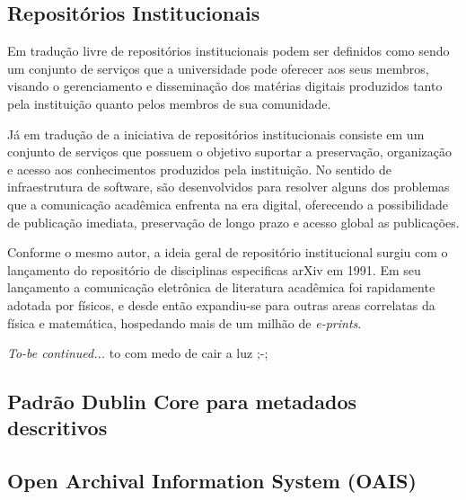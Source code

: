 \subsection{Repositórios Institucionais}

Em tradução livre de \cite{LYNCH:2003} repositórios institucionais podem
ser definidos como sendo um conjunto de serviços que a universidade pode
oferecer aos seus membros, visando o gerenciamento e disseminação dos matérias
digitais produzidos tanto pela instituição quanto pelos membros de sua comunidade.

Já em tradução de \cite{2015:Callicott} a iniciativa de repositórios institucionais
consiste em um conjunto de serviços que possuem o objetivo suportar a preservação,
organização e acesso aos conhecimentos produzidos pela instituição. No sentido de
infraestrutura de software, são desenvolvidos para resolver alguns dos problemas
que a comunicação acadêmica enfrenta na era digital, oferecendo a possibilidade
de publicação imediata, preservação de longo prazo e acesso global as publicações.

Conforme o mesmo autor, a ideia geral de repositório institucional surgiu com o
lançamento do repositório de disciplinas especificas arXiv em 1991. Em seu
lançamento a comunicação eletrônica de literatura acadêmica foi rapidamente
adotada por físicos, e desde então expandiu-se para outras areas correlatas
da física e matemática, hospedando mais de um milhão de \emph{e-prints}.

\emph{To-be continued...} to com medo de cair a luz ;-;




\subsection{Padrão Dublin Core para metadados descritivos}
\subsection{Open Archival Information System (OAIS)}

